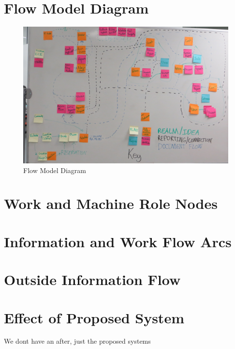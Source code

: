 \documentclass[12pt]{article} %
\begin{document}
\section{Flow Model Diagram} %
  \begin{figure}[H]
  \centering
  \includegraphics[width=0.95\linewidth]{flowChart}
  \caption{Flow Model Diagram}
  \label{fig:FlowChart}
  \end{figure}

\section{Work and Machine Role Nodes} %

\section{Information and Work Flow Arcs} %

\section{Outside Information Flow} %


\section{Effect of Proposed System} %
We dont have an after, just the proposed systems
\end{document}

